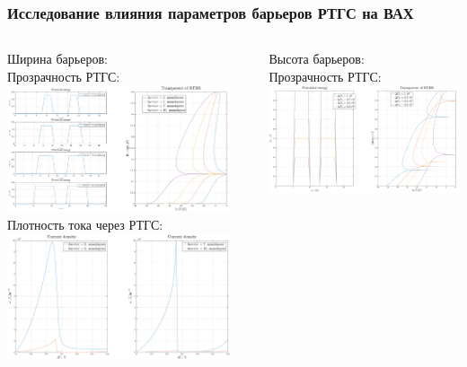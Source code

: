 \documentclass[10pt,pdf,hyperref={unicode},aspectratio={169}]{beamer}
\begin{document}
\begin{frame}
	\frametitle{Исследование влияния параметров барьеров РТГС на ВАХ}
	\begin{columns}
		{\color{blue} Ширина барьеров:}\\
		{\color{red} Прозрачность РТГС:}
	   	\includegraphics[width=.8\linewidth,center]{assets/qbwt}\\
		{\color{red} Плотность тока через РТГС:}
	   	\includegraphics[width=.8\linewidth,center]{assets/qbwj}
		\rule[-55mm]{0.2ex}{75mm}
		{\color{blue} Высота барьеров:}\\
		{\color{red}\small Прозрачность РТГС:}\\
	   	\includegraphics[width=.8\linewidth,center]{assets/qbht}\\

\end{columns}
\end{frame}
\end{document}
